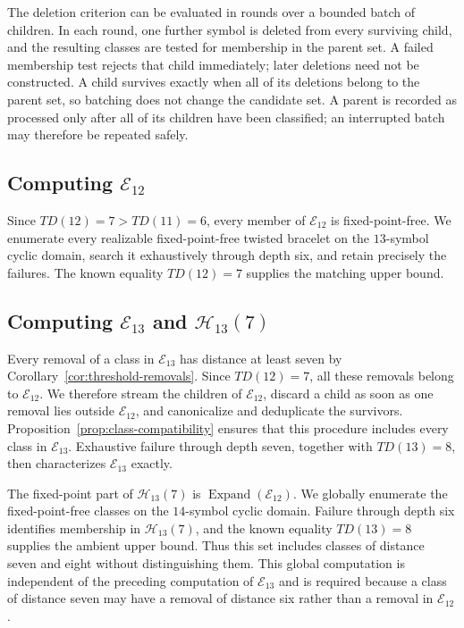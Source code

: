 \documentclass[11pt]{article}
\theoremstyle{definition}
\theoremstyle{remark}
\newcommand{\En}{\mathcal E}
\newcommand{\Hn}{\mathcal H}
\begin{document}
The deletion criterion can be evaluated in rounds over a bounded batch of
children.  In each round, one further symbol is deleted from every surviving
child, and the resulting classes are tested for membership in the parent
set.  A failed membership test rejects that child immediately; later
deletions need not be constructed.  A child survives exactly when all of its
deletions belong to the parent set, so batching does not change the candidate
set.  A parent is recorded as processed only after all of its children have
been classified; an interrupted batch may therefore be repeated safely.

\subsection{Computing \texorpdfstring{$\En_{12}$}{E12}}

Since $TD(12)=7>TD(11)=6$, every member of $\En_{12}$ is
fixed-point-free.  We enumerate every realizable fixed-point-free twisted
bracelet on the $13$-symbol cyclic domain, search it exhaustively through
depth six, and retain precisely the failures.  The known equality $TD(12)=7$
supplies the matching upper bound.

\subsection{Computing \texorpdfstring{$\En_{13}$}{E13} and
\texorpdfstring{$\Hn_{13}(7)$}{H13(7)}}

Every removal of a class in $\En_{13}$ has distance at least seven by
Corollary~\ref{cor:threshold-removals}.  Since $TD(12)=7$, all these removals
belong to $\En_{12}$.  We therefore stream the children of $\En_{12}$,
discard a child as soon as one removal lies outside $\En_{12}$, and
canonicalize and deduplicate the survivors.  Proposition~\ref{prop:class-compatibility}
ensures that this procedure includes every class in $\En_{13}$.  Exhaustive
failure through depth seven, together with $TD(13)=8$, then characterizes
$\En_{13}$ exactly.

The fixed-point part of $\Hn_{13}(7)$ is
$\operatorname{Expand}(\En_{12})$.  We globally enumerate the
fixed-point-free classes on the $14$-symbol cyclic domain.  Failure through
depth six identifies membership in $\Hn_{13}(7)$, and the known equality
$TD(13)=8$ supplies the ambient upper bound.  Thus this set includes classes
of distance seven and eight without distinguishing them.  This
global computation is independent of the preceding computation of
$\En_{13}$ and is required because a class of distance seven may have a
removal of distance six rather than a removal in $\En_{12}$.
\end{document}
